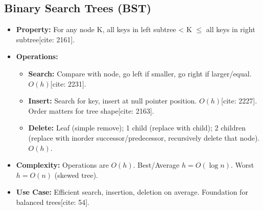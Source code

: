\documentclass{article}
\begin{document}
\subsection{Binary Search Trees (BST)}
\begin{itemize}
    \item \textbf{Property:} For any node K, all keys in left subtree < K $\le$ all keys in right subtree[cite: 2161].
    \item \textbf{Operations:}
          \begin{itemize}
              \item \textbf{Search:} Compare with node, go left if smaller, go right if larger/equal. $O(h)$[cite: 2231].
              \item \textbf{Insert:} Search for key, insert at null pointer position. $O(h)$[cite: 2227]. Order matters for tree shape[cite: 2163].
              \item \textbf{Delete:} Leaf (simple remove); 1 child (replace with child); 2 children (replace with inorder successor/predecessor, recursively delete that node). $O(h)$.
          \end{itemize}
    \item \textbf{Complexity:} Operations are $O(h)$. Best/Average $h = O(\log n)$. Worst $h = O(n)$ (skewed tree).
    \item \textbf{Use Case:} Efficient search, insertion, deletion on average. Foundation for balanced trees[cite: 54].
\end{itemize}
\end{document}
